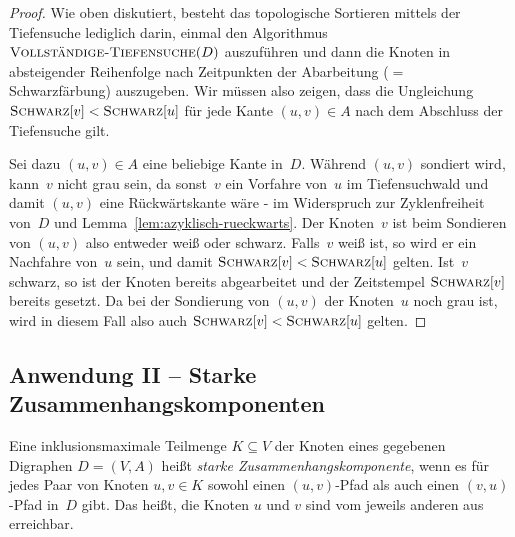 \begin{proof}
Wie oben diskutiert, besteht das topologische Sortieren mittels der Tiefensuche lediglich darin, einmal den Algorithmus $\mathop{\text{\textsc{Vollständige-Tiefensuche}}}(D)$ auszuführen und dann die Knoten in absteigender Reihenfolge nach Zeitpunkten der Abarbeitung ($=$ Schwarzfärbung) auszugeben.
Wir müssen also zeigen, dass die Ungleichung $\mathop{\text{\textsc{Schwarz}}}[v] < \mathop{\text{\textsc{Schwarz}}}[u]$ für jede Kante $(u,v) \in A$ nach dem Abschluss der Tiefensuche gilt.

Sei dazu $(u,v) \in A$ eine beliebige Kante in~$D$.
Während $(u,v)$ sondiert wird, kann~$v$ nicht grau sein, da sonst~$v$ ein Vorfahre von~$u$ im Tiefensuchwald und damit $(u,v)$ eine Rückwärtskante wäre - im Widerspruch zur Zyklenfreiheit von~$D$ und Lemma~\ref{lem:azyklisch-rueckwarts}.
Der Knoten~$v$ ist beim Sondieren von $(u,v)$ also entweder weiß oder schwarz.
Falls~$v$ weiß ist, so wird er ein Nachfahre von~$u$ sein, und damit $\mathop{\text{\textsc{Schwarz}}}[v] < \mathop{\text{\textsc{Schwarz}}}[u]$ gelten.
Ist~$v$ schwarz, so ist der Knoten bereits abgearbeitet und der Zeitstempel $\mathop{\text{\textsc{Schwarz}}}[v]$ bereits gesetzt.
Da bei der Sondierung von $(u,v)$ der Knoten~$u$ noch grau ist, wird in diesem Fall also auch $\mathop{\text{\textsc{Schwarz}}}[v] < \mathop{\text{\textsc{Schwarz}}}[u]$ gelten.
\end{proof}


\subsection{Anwendung II -- Starke Zusammenhangskomponenten}

\begin{defn}
Eine inklusionsmaximale Teilmenge $K \subseteq V$ der Knoten eines gegebenen Digraphen $D=(V,A)$ heißt \emph{starke Zusammenhangskomponente}, wenn es für jedes Paar von Knoten $u,v \in K$ sowohl einen $(u,v)$-Pfad als auch einen $(v,u)$-Pfad in~$D$ gibt.
Das heißt, die Knoten $u$ und $v$ sind vom jeweils anderen aus erreichbar.
\end{defn} 

